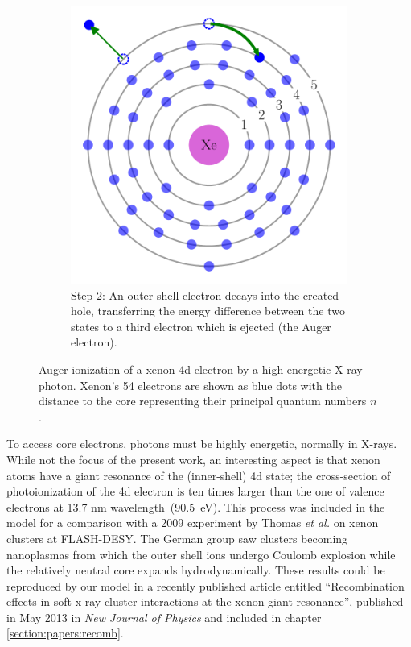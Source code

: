 \begin{figure}
\begin{subfigure}[t]{0.45\columnwidth}
        \includegraphics[width=\textwidth]{figures/auger_step_2}
        \caption{Step 2: An outer shell electron decays into the created hole,
                 transferring the energy difference between the two states to a
                 third electron which is ejected (the Auger electron).}
        \label{fig:auger:2}
    \end{subfigure}
        \caption{\label{fig:auger}Auger ionization of a xenon 4d electron by a
                 high energetic X-ray photon. Xenon's 54 electrons are shown
                 as blue dots with the distance to the core representing their
                 principal quantum numbers $n$.}
\end{figure}

To access core electrons, photons must be highly energetic, normally in X-rays.
While not the focus of the present work, an interesting aspect is that xenon
atoms have a giant resonance of the (inner-shell) 4d state; the cross-section of
photoionization of the 4d electron is ten times larger than the
one of valence  electrons at 13.7 nm wavelength~(90.5~eV)\cite{Becker1986}.
This process was included in the model for a comparison with a 2009 experiment
by Thomas \textit{et al.}\cite{Thomas2009} on xenon clusters at FLASH-DESY.
The German group saw clusters becoming nanoplasmas from which the outer shell
ions undergo Coulomb explosion while the relatively neutral core expands
hydrodynamically. These results could be reproduced by our model in a recently
published article entitled ``Recombination effects in soft-x-ray cluster
interactions at the xenon giant resonance'', published in May 2013 in
\textit{New Journal of Physics}\cite{Ackad2013} and included in chapter
\ref{section:papers:recomb}.


